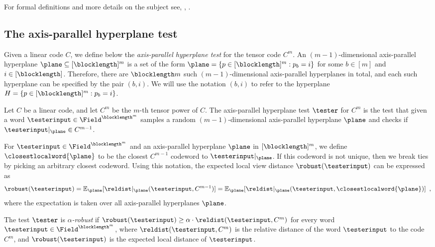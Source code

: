 \documentclass{toc}
\theoremstyle{plain}
\begin{document}
For formal definitions and more details on the subject see, \eg, \cite{Goldreich2010}.
%
%
\subsection{The axis-parallel hyperplane test}

Given a linear code $C$, we define below the \emph{axis-parallel hyperplane test} for the tensor code $C^m$.
An $(m-1)$-dimensional axis-parallel hyperplane $\plane \subseteq [\blocklength]^m$ is a set of the form $\plane = \{p \in [\blocklength]^m : p_b = i\}$ for some $b \in [m]$ and $i \in [\blocklength]$. Therefore, there are $\blocklength m$ such $(m-1)$-dimensional axis-parallel hyperplanes in total, and each such hyperplane can be specified by the pair $(b,i)$. We will use the notation $(b,i)$ to refer to the hyperplane $H = \{p \in [\blocklength]^m : p_b = i\}$.


\begin{definition}\label{def:tester}
Let $C$ be a linear code, and let $C^m$ be the
%
$m$-th tensor power of $C$.                                                     %
The axis-parallel hyperplane test $\tester$ for $C^m$ is the test that
given a word $\testerinput \in \Field^{\blocklength^{m}}$
samples a random $(m-1)$-dimensional axis-parallel hyperplane $\plane$
and checks if $\testerinput \vert_{\plane} \in C^{m-1}$.
\end{definition}

For $\testerinput \in \Field^{\blocklength^{m}}$ and an axis-parallel hyperplane $\plane$ in $[\blocklength]^m$, we define $\closestlocalword{\plane}$ to be the closest $C^{m-1}$ codeword to $\testerinput \vert_{\plane}$.
If this codeword is not unique, then we break ties by picking an arbitrary closest codeword.
Using this notation, the expected local view distance $\robust(\testerinput)$ can be expressed as
\begin{equation*}
\robust(\testerinput) = {\mathbb E}_{\plane}[\reldist \vert_{\plane}(\testerinput, C^{m-1})]
 = {\mathbb E}_{\plane}[\reldist \vert_{\plane}(\testerinput, \closestlocalword{\plane})]
%
\enspace,
\end{equation*}
where the expectation is taken over all axis-parallel hyperplanes $\plane$.

\begin{definition}\label{def:robust tester}
The test $\tester$ is \emph{$\alpha$-robust} if $\robust(\testerinput) \geq \alpha \cdot \reldist(\testerinput, C^{m})$ for every word $\testerinput \in \Field^{\blocklength^{m}}$, where $\reldist(\testerinput, C^{m})$ is the relative distance of the word $\testerinput$ to the code $C^{m}$, and $\robust(\testerinput)$ is the expected local distance of $\testerinput$.
\end{definition}
\end{document}
